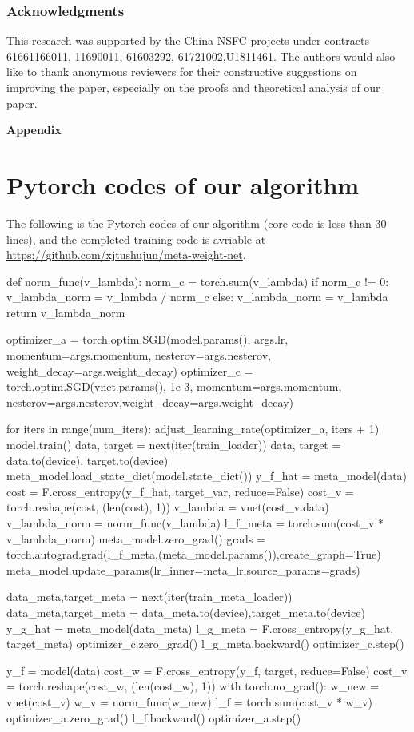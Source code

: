 \documentclass{article}
\begin{document}
	
	\subsubsection*{Acknowledgments}
	This research was supported by the China NSFC projects under contracts 61661166011, 11690011, 61603292, 61721002,U1811461.
	The authors would also like to thank anonymous reviewers for their constructive suggestions on improving the paper, especially on the proofs and theoretical analysis of our paper.
	
	
	
	
	\newpage
	
	\appendix
	
	\begin{Large}
		\textbf{Appendix}
	\end{Large}


	\setcounter{theorem}{0}
	\setcounter{footnote}{0}
	
	\section{Pytorch codes of our algorithm}
	The following is the Pytorch codes of our algorithm (core code is less than 30 lines), and the completed training code is avriable at \url{https://github.com/xjtushujun/meta-weight-net}.
	\begin{python}	
		def norm_func(v_lambda):
		norm_c = torch.sum(v_lambda)
		if norm_c != 0:
		v_lambda_norm = v_lambda / norm_c
		else:
		v_lambda_norm = v_lambda
		return 	v_lambda_norm
		
		optimizer_a = torch.optim.SGD(model.params(), args.lr, momentum=args.momentum, nesterov=args.nesterov, weight_decay=args.weight_decay)
		optimizer_c = torch.optim.SGD(vnet.params(), 1e-3, momentum=args.momentum, nesterov=args.nesterov,weight_decay=args.weight_decay)
		
		for iters in range(num_iters):
		adjust_learning_rate(optimizer_a, iters + 1)
		model.train()
		data, target = next(iter(train_loader))
		data, target = data.to(device), target.to(device)
		meta_model.load_state_dict(model.state_dict())
		y_f_hat = meta_model(data)
		cost = F.cross_entropy(y_f_hat, target_var, reduce=False)
		cost_v = torch.reshape(cost, (len(cost), 1))
		v_lambda = vnet(cost_v.data)
		v_lambda_norm = norm_func(v_lambda)
		l_f_meta = torch.sum(cost_v * v_lambda_norm)
		meta_model.zero_grad()
		grads = torch.autograd.grad(l_f_meta,(meta_model.params()),create_graph=True)
		meta_model.update_params(lr_inner=meta_lr,source_params=grads)
		
		data_meta,target_meta = next(iter(train_meta_loader))
		data_meta,target_meta = data_meta.to(device),target_meta.to(device)
		y_g_hat = meta_model(data_meta)
		l_g_meta = F.cross_entropy(y_g_hat, target_meta)
		optimizer_c.zero_grad()
		l_g_meta.backward()
		optimizer_c.step()
		
		y_f = model(data)
		cost_w = F.cross_entropy(y_f, target, reduce=False)
		cost_v = torch.reshape(cost_w, (len(cost_w), 1))
		with torch.no_grad():
		w_new = vnet(cost_v)
		w_v = norm_func(w_new)
		l_f = torch.sum(cost_v * w_v)
		optimizer_a.zero_grad()
		l_f.backward()
		optimizer_a.step()
	\end{python}
	
\end{document}
